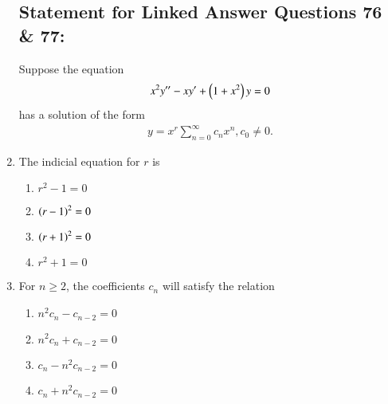 \documentclass[journal]{IEEEtran}
\begin{document}
\begin{enumerate}
\subsection*{Statement for Linked Answer Questions 76 \& 77:}
Suppose the equation 
\begin{align*}
    x^2 y^{{\prime}{\prime}} - x y^{\prime} + \left(1+x^2\right) y = 0
\end{align*}
has a solution of the form
\begin{align*}
    y = x^{r} \sum^{\infty}_{n=0} c_n x^n, c_0 \neq 0.
\end{align*}
\item The indicial equation for $r$ is
\begin{multicols}{2}
    \begin{enumerate}
        \item $r^2 - 1 = 0$
        \item $\left(r-1\right)^2 = 0$
        \item $\left(r+1\right)^2 = 0$
        \item $r^2+1 = 0$
    \end{enumerate}
\end{multicols}
\item For $n\geq 2 $, the coefficients $c_n$ will satisfy the relation
\begin{multicols}{2}
    \begin{enumerate}
        \item $n^2 c_n - c_{n-2} = 0$
        \item $n^2 c_n + c_{n-2} = 0$
        \item $c_n - n^2 c_{n-2} = 0$
        \item $c_n + n^2 c_{n-2} = 0$
    \end{enumerate}
\end{multicols}


\end{enumerate}
\end{document}
